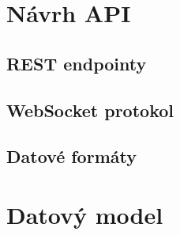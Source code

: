 \section{Návrh API}
\label{sec:navrh_api}


\subsection{REST endpointy}


\subsection{WebSocket protokol}


\subsection{Datové formáty}


\section{Datový model}
\label{sec:datovy_model}


